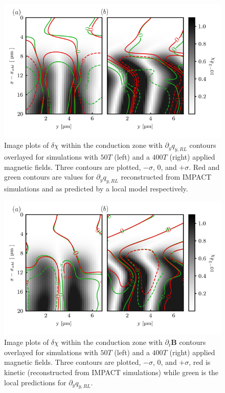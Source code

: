 \documentclass[aip,reprint]{revtex4-1}
\begin{document}
\begin{figure}
	\includegraphics[width=1.0\columnwidth]{pics/plot_dqy_qRL_contour_11_LT1_100p_green.png}
	\caption{\label{fig:qrl_contour} Image plots of $\delta \chi$ within the conduction zone with $\partial_y q_{y,RL}$ contours overlayed for simulations with $\si{50}{T}$ (left) and a $\si{400}{T}$ (right) applied magnetic fields. Three contours are plotted, $-\sigma$, $0$, and $+\sigma$. Red and green contours are values for $\partial_y q_{y,RL}$ reconstructed from IMPACT simulations and as predicted by a local model respectively. }
\end{figure}

\begin{figure}
	\includegraphics[width=1.0\columnwidth]{pics/plot_dqy_bier_contour_11_LT1_100p_green.png}
	\caption{\label{fig:bier_contour} Image plots of $\delta \chi$ within the conduction zone with $\partial_t \mathbf{B}$ contours overlayed for simulations with $\si{50}{T}$ (left) and a $\si{400}{T}$ (right) applied magnetic fields.   Three contours are plotted, $-\sigma$, $0$, and $+\sigma$, red is kinetic (reconstructed from IMPACT simulations) while green is the local predictions for $\partial_y q_{y,RL}$. }
\end{figure}
\end{document}
